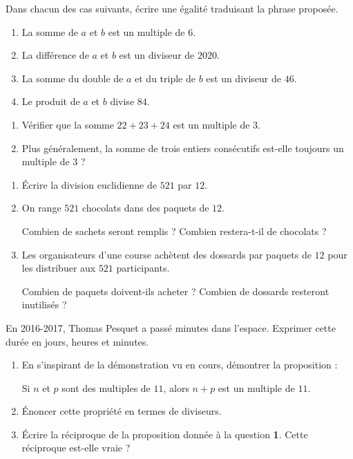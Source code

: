 Dans chacun des cas suivants, écrire une égalité traduisant la phrase proposée.
\begin{enumerate}
\item La somme de $a$ et $b$ est un multiple de $6$.
\item La différence de $a$ et $b$ est un diviseur de $2020$.
\item La somme du double de $a$ et du triple de $b$ est un diviseur de $46$.
\item Le produit de $a$ et $b$ divise $84$.
\end{enumerate}



\exo

\begin{enumerate}
\item Vérifier que la somme $22+23+24$ est un multiple de $3$.
\item Plus généralement, la somme de trois entiers consécutifs est-elle toujours un multiple de $3$ ?
\end{enumerate}

\exo

\begin{enumerate}
\item Écrire la division euclidienne de $521$ par $12$.
\item On range $521$ chocolats dans des paquets de $12$.

Combien de sachets seront remplis ? Combien restera-t-il de chocolats ?
\item Les organisateurs d'une course achètent des dossards par paquets de $12$ pour les distribuer aux $521$ participants.

Combien de paquets doivent-ils acheter ? Combien de dossards resteront inutilisés ?
\end{enumerate}

\exo

En 2016-2017, Thomas Pesquet a passé  minutes dans l'espace. Exprimer cette durée en jours, heures et minutes.

\exo

\begin{enumerate}
\item En s'inspirant de la démonstration vu en cours, démontrer la proposition :
\begin{center}
\og Si $n$ et $p$ sont des multiples de $11$, alors $n+p$ est un multiple de $11$. \fg{} 
\end{center}
\item Énoncer cette propriété en termes de diviseurs.
\item Écrire la réciproque de la proposition donnée à la question \textbf{1}. Cette réciproque est-elle vraie ?
\end{enumerate}

